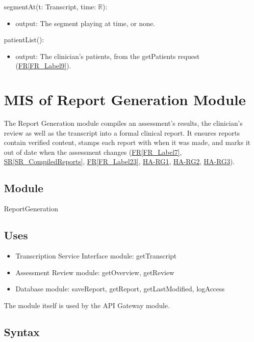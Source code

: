 \documentclass[12pt, titlepage]{article}
\newcommand{\srsref}[2]{\href{https://github.com/Nour-Fawaz/MacaBoca/blob/main/pdfs/SRS/SRS.pdf}{#1\ref*{#2}}}
\newcommand{\hazref}[1]{\href{https://github.com/Nour-Fawaz/MacaBoca/blob/main/pdfs/HazardAnalysis/HazardAnalysis.pdf}{#1}}
\begin{document}
\noindent segmentAt(t: Transcript, time: $\mathbb{R}$):
\begin{itemize}
\item output: The segment playing at time, or none.
\end{itemize}

\noindent patientList():
\begin{itemize}
\item output: The clinician's patients, from the getPatients request (\srsref{FR}{FR_Label9}).
\end{itemize}

\newpage
\section{MIS of Report Generation Module} \label{ReportGeneration}
The Report Generation module compiles an assessment's results, the clinician's review 
as well as the transcript into a formal clinical report. It ensures reports
contain verified content, stamps each report with when it was made, 
and marks it out of date when the assessment changes (\srsref{FR}{FR_Label7}, 
\srsref{SR}{SR_CompiledReports}, \srsref{FR}{FR_Label23}, \hazref{HA-RG1}, \hazref{HA-RG2}, \hazref{HA-RG3}).

\subsection{Module}
ReportGeneration

\subsection{Uses}
\begin{itemize}
\item Transcription Service Interface module: getTranscript
\item Assessment Review module: getOverview, getReview
\item Database module: saveReport, getReport, getLastModified, logAccess
\end{itemize}
The module itself is used by the API Gateway module.

\subsection{Syntax}
\end{document}

